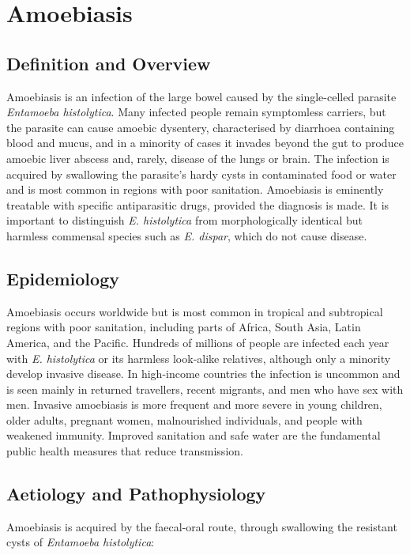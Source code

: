 \chapter{Amoebiasis}

\section*{Definition and Overview}
Amoebiasis is an infection of the large bowel caused by the single-celled parasite \textit{Entamoeba histolytica}. Many infected people remain symptomless carriers, but the parasite can cause amoebic dysentery, characterised by diarrhoea containing blood and mucus, and in a minority of cases it invades beyond the gut to produce amoebic liver abscess and, rarely, disease of the lungs or brain. The infection is acquired by swallowing the parasite's hardy cysts in contaminated food or water and is most common in regions with poor sanitation. Amoebiasis is eminently treatable with specific antiparasitic drugs, provided the diagnosis is made. It is important to distinguish \textit{E. histolytica} from morphologically identical but harmless commensal species such as \textit{E. dispar}, which do not cause disease.

\section*{Epidemiology}
Amoebiasis occurs worldwide but is most common in tropical and subtropical regions with poor sanitation, including parts of Africa, South Asia, Latin America, and the Pacific. Hundreds of millions of people are infected each year with \textit{E. histolytica} or its harmless look-alike relatives, although only a minority develop invasive disease. In high-income countries the infection is uncommon and is seen mainly in returned travellers, recent migrants, and men who have sex with men. Invasive amoebiasis is more frequent and more severe in young children, older adults, pregnant women, malnourished individuals, and people with weakened immunity. Improved sanitation and safe water are the fundamental public health measures that reduce transmission.

\section*{Aetiology and Pathophysiology}
Amoebiasis is acquired by the faecal-oral route, through swallowing the resistant cysts of \textit{Entamoeba histolytica}:

